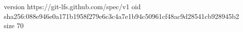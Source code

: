 version https://git-lfs.github.com/spec/v1
oid sha256:088e946e0a171b1958f279e6c3c4a7e1b94c50961cf48ac9d28541cb928945b2
size 70

